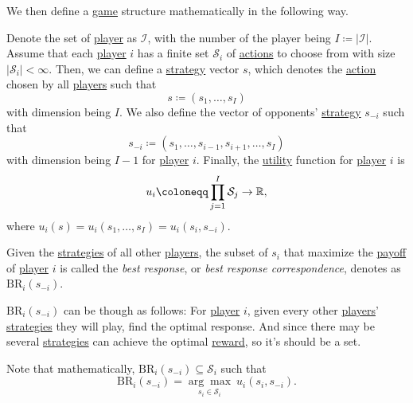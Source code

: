 We then define a \hyperref[def:game]{game} structure mathematically in the following way.
\begin{definition}\label{def:mathematical-game}
	Denote the set of \hyperref[def:player]{player} as \(\mathcal{I}\), with the number of the player being \(I\coloneqq \left\vert \mathcal{I} \right\vert \).
	Assume that each \hyperref[def:player]{player} \(i\) has a finite set \(\mathcal{S}_i\) of \hyperref[def:strategy]{actions} to choose from with size
	\(\left\vert \mathcal{S}_i \right\vert<\infty  \). Then, we can define a \hyperref[def:strategy]{strategy} vector \(s\), which denotes the
	\hyperref[def:strategy]{action} chosen by all \hyperref[def:player]{players} such that
	\[
		s\coloneqq (s_1, \ldots , s_I)
	\]
	with dimension being \(I\). We also define the vector of opponents' \hyperref[def:strategy]{strategy} \(s_{-i}\) such that
	\[
		s_{-i}\coloneqq (s_1,\ldots,s_{i - 1},s_{i + 1} ,\ldots,s_I)
	\]
	with dimension being \(I - 1\) for \hyperref[def:player]{player} \(i\).
	Finally, the \hyperref[def:reward]{utility} function for \hyperref[def:player]{player} \(i\) is
	\[
		u_{i} \coloneqq \prod\limits_{j = 1}^{I} \mathcal{S}_j \to \mathbb{\MakeUppercase{R}},
	\]
	where \(u_{i}(s) = u_{i}(s_1, \ldots , s_I) = u_{i}(s_{i}, s_{-i})\).
\end{definition}

\begin{definition}\label{def:best-response}
	Given the \hyperref[def:strategy]{strategies} of all other \hyperref[def:player]{players}, the subset of \(s_{i}\) that maximize the \hyperref[def:reward]{payoff}
	of \hyperref[def:player]{player} \(i\) is called the \emph{best response}, or \emph{best response correspondence}, denotes as \(\mathrm{BR}_i(s_{-i})\).
\end{definition}

\begin{intuition}
	\(\mathrm{BR}_i(s_{-i})\) can be though as follows: For \hyperref[def:player]{player} \(i\), given every other \hyperref[def:player]{players}'
	\hyperref[def:strategy]{strategies} they will play, find the optimal response. And since there may be several \hyperref[def:strategy]{strategies} can achieve
	the optimal \hyperref[def:reward]{reward}, so it's should be a set.
\end{intuition}

\begin{remark}
	Note that mathematically, \(\mathrm{BR}_i(s_{-i}) \subseteq \mathcal{S}_i\) such that
	\[
		\mathrm{BR}_i(s_{-i})= \underset{s_{i}\in\mathcal{S}_i}{\arg\max}\ u_{i}(s_{i}, s_{-i}).
	\]
\end{remark}
